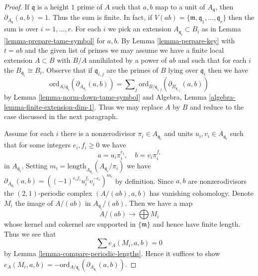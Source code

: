 \begin{proof}
If $\mathfrak q$ is a height $1$ prime of $A$ such that $a, b$
map to a unit of $A_\mathfrak q$, then $\partial_{A_\mathfrak q}(a, b) = 1$.
Thus the sum is finite. In fact, if
$V(ab) = \{\mathfrak m, \mathfrak q_1, \ldots, \mathfrak q_r\}$
then the sum is over $i = 1, \ldots, r$.
For each $i$ we pick an extension $A_{\mathfrak q_i} \subset B_i$
as in Lemma \ref{lemma-prepare-tame-symbol} for $a, b$.
By Lemma \ref{lemma-perpare-key} with $t = ab$ and the given list of primes
we may assume we have a finite local extension $A \subset B$
with $B/A$ annihilated by a power of $ab$ and such that
for each $i$ the $B_{\mathfrak q_i} \cong B_i$.
Observe that if $\mathfrak q_{i, j}$ are the primes of $B$
lying over $\mathfrak q_i$ then we have
$$
\text{ord}_{A/\mathfrak q_i}(\partial_{A_{\mathfrak q_i}}(a, b))
=
\sum\nolimits_j
\text{ord}_{B/\mathfrak q_{i, j}}(\partial_{B_{\mathfrak q_{i, j}}}(a, b))
$$
by Lemma \ref{lemma-norm-down-tame-symbol} and
Algebra, Lemma \ref{algebra-lemma-finite-extension-dim-1}.
Thus we may replace $A$ by $B$ and
reduce to the case discussed in the next paragraph.

\medskip\noindent
Assume for each $i$ there is a nonzerodivisor
$\pi_i \in A_{\mathfrak q_i}$ and units $u_i, v_i \in A_{\mathfrak q_i}$
such that for some integers $e_i, f_i \geq 0$ we have
$$
a = u_i \pi_i^{e_i},\quad b = v_i \pi_i^{f_i}
$$
in $A_{\mathfrak q_i}$. Setting
$m_i = \text{length}_{A_{\mathfrak q_i}}(A_{\mathfrak q_i}/\pi_i)$
we have
$\partial_{A_{\mathfrak q_i}}(a, b) =
((-1)^{e_if_i}u_i^{f_i}v_i^{-e_i})^{m_i}$ by definition.
Since $a, b$ are nonzerodivisors the
$(2, 1)$-periodic complex $(A/(ab), a, b)$ has vanishing cohomology.
Denote $M_i$ the image of $A/(ab)$ in $A_{\mathfrak q_i}/(ab)$.
Then we have a map
$$
A/(ab) \longrightarrow \bigoplus M_i
$$
whose kernel and cokernel are supported in $\{\mathfrak m\}$
and hence have finite length. Thus we see that
$$
\sum e_A(M_i, a, b) = 0
$$
by Lemma \ref{lemma-compare-periodic-lengths}. Hence it suffices to show
$e_A(M_i, a, b) =
- \text{ord}_{A/\mathfrak q_i}(\partial_{A_{\mathfrak q_i}}(a, b))$.


\end{proof}
